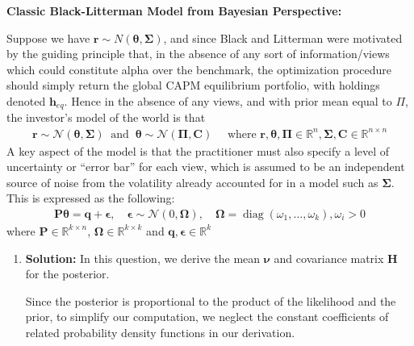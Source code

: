 \documentclass[11pt]{article}
\theoremstyle{plain} %
\newenvironment{topic}
  {\color{C2}\normalfont\begin{framed}\begingroup}
    {\endgroup\end{framed}}
\theoremstyle{remark}
\begin{document}
\begin{topic}
  \textbf{Classic Black-Litterman Model from Bayesian Perspective:}

  Suppose we have $\boldsymbol{r} \sim N(\boldsymbol{\theta}, \boldsymbol{\Sigma})$,
  and since Black and Litterman were motivated by
  the guiding principle that, in the absence of any sort of information/views
  which could constitute alpha over the benchmark, the optimization procedure
  should simply return the global CAPM equilibrium portfolio, with holdings
  denoted $\boldsymbol{h}_{e q}$. Hence in the absence of any views, and with
  prior mean equal to $\Pi$, the investor's model of the world is that
  \begin{align}
    \boldsymbol{r} \sim \mathcal{N}(\boldsymbol{\theta}, \boldsymbol{\Sigma}) \  \text { and } \  \boldsymbol{\theta} \sim \mathcal{N}(\boldsymbol{\Pi}, \boldsymbol{C}) \quad \text{ where } \boldsymbol{r}, \boldsymbol{\theta},\boldsymbol{\Pi} \in \mathbb{R}^n, \boldsymbol{\Sigma}, \boldsymbol{C}\in \mathbb{R}^{n\times n}\label{eq:BLB returns}
  \end{align}
  A key aspect of the model is that the practitioner must also specify a level of
  uncertainty or ``error bar'' for each view, which is assumed to be an independent
  source of noise from the volatility already accounted for in a model such as
  $\boldsymbol{\Sigma}$. This is expressed as the following:
  \begin{align}
    \boldsymbol{P} \boldsymbol{\theta}=\boldsymbol{q}+\boldsymbol{\epsilon}, \quad \boldsymbol{\epsilon} \sim \mathcal{N}(0, \boldsymbol{\Omega}), \quad \boldsymbol{\Omega}=\operatorname{diag}\left(\omega_1, \ldots, \omega_k\right), \omega_i > 0 \label{eq:BLB views}
  \end{align}
  where $\boldsymbol{P} \in \mathbb{R}^{k\times n}$, $\boldsymbol{\Omega} \in \mathbb{R}^{k\times k}$ and $\boldsymbol{q},\boldsymbol{\epsilon} \in \mathbb{R}^k$

  \begin{enumerate}[label=(\alph*)]
    \item \textbf{Solution:} In this question, we derive the mean $\boldsymbol{\nu}$ and covariance
          matrix $\boldsymbol{H}$ for the posterior.

          Since the posterior is proportional to the product of the likelihood and the
          prior, to simplify our computation, we neglect the constant coefficients of related probability density functions in
          our derivation.


\end{enumerate}
\end{topic}
\end{document}
